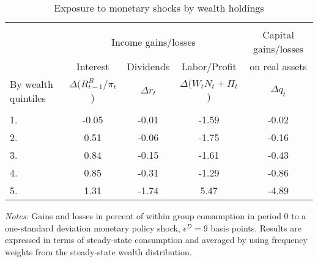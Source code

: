 \begin{table} \caption{Exposure to monetary shocks by wealth holdings} \label{Tab:RD} 
\begin{center}
\begin{threeparttable}
\begin{tabular*}{\textwidth}{l @{\extracolsep{\fill}} cccc}
 \hline \hline 
\\ &\multicolumn{3}{c}{Income gains/losses} & Capital gains/losses   \\ \cline{2-4} 
                       & Interest  &  Dividends  & Labor/Profit & on real assets    \\
By wealth quintiles     & $\Delta (R^B_{t-1}/\pi_t$)   & $\Delta r_t$ &  $\Delta (W_tN_t+\Pi_t$) & $\Delta q_t$   \\ \hline 
\\ 1.   &       -0.05 &    -0.01 &    -1.59 &    -0.02 
\\ 2.  &        0.51 &    -0.06 &    -1.75 &    -0.16 
\\ 3.  &        0.84 &    -0.15 &    -1.61 &    -0.43 
\\ 4.  &        0.85 &    -0.31 &    -1.29 &    -0.86 
\\ 5.  &        1.31 &    -1.74 &     5.47 &    -4.89 
\\ \hline 
\end{tabular*} 
\begin{small}
\begin{tablenotes}
\item \textit{Notes:} Gains and losses in percent of within group consumption in period 0 to a one-standard deviation monetary policy shock, $\epsilon^D=9$ basis points. Results are expressed in terms of steady-state consumption and averaged by using frequency weights from the steady-state wealth distribution. 
\end{tablenotes}
\end{small}
\end{threeparttable}
\end{center}
\end{table}
